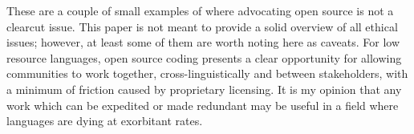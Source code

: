 These are a couple of small examples of where advocating open source is not a clearcut issue. This paper is not meant to provide a solid overview of all ethical issues; however, at least some of them are worth noting here as caveats. For low resource languages, open source coding presents a clear opportunity for allowing communities to work together, cross-linguistically and between stakeholders, with a minimum of friction caused by proprietary licensing. It is my opinion that any work which can be expedited or made redundant may be useful in a field where languages are dying at exorbitant rates.

